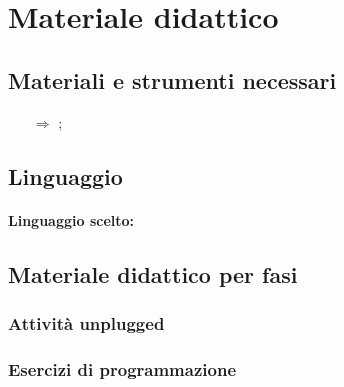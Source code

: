 \chapter{Materiale didattico}

\section{Materiali e strumenti necessari}

\begin{itemize}
    \item [$\Rightarrow$];
\end{itemize}

\section{Linguaggio}

\subsubsection{Linguaggio scelto:} 


\sol{}

\section{Materiale didattico per fasi}

\subsection{Attività unplugged}

\subsection{Esercizi di programmazione}